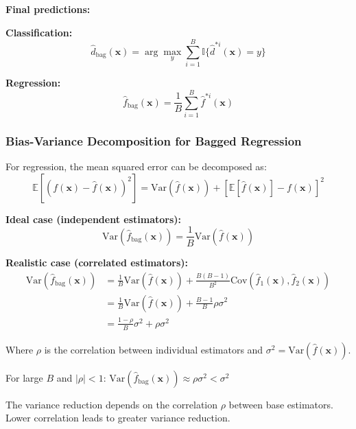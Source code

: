 \documentclass[12pt,a4paper]{article}
\begin{document}
\textbf{Final predictions:}

\textbf{Classification:}
\begin{equation}
\hat{d}_{\text{bag}}(\mathbf{x}) = \arg\max_y \sum_{i=1}^B \mathbb{I}\{\hat{d}^{*i}(\mathbf{x}) = y\}
\end{equation}

\textbf{Regression:}
\begin{equation}
\hat{f}_{\text{bag}}(\mathbf{x}) = \frac{1}{B} \sum_{i=1}^B \hat{f}^{*i}(\mathbf{x})
\end{equation}

\subsubsection{Bias-Variance Decomposition for Bagged Regression}

For regression, the mean squared error can be decomposed as:
\begin{equation}
\mathbb{E}[(f(\mathbf{x}) - \hat{f}(\mathbf{x}))^2] = \text{Var}(\hat{f}(\mathbf{x})) + [\mathbb{E}[\hat{f}(\mathbf{x})] - f(\mathbf{x})]^2
\end{equation}

\textbf{Ideal case (independent estimators):}
\begin{equation}
\text{Var}(\hat{f}_{\text{bag}}(\mathbf{x})) = \frac{1}{B} \text{Var}(\hat{f}(\mathbf{x}))
\end{equation}

\textbf{Realistic case (correlated estimators):}
\begin{align}
\text{Var}(\hat{f}_{\text{bag}}(\mathbf{x})) &= \frac{1}{B} \text{Var}(\hat{f}(\mathbf{x})) + \frac{B(B-1)}{B^2} \text{Cov}(\hat{f}_1(\mathbf{x}), \hat{f}_2(\mathbf{x})) \\
&= \frac{1}{B} \text{Var}(\hat{f}(\mathbf{x})) + \frac{B-1}{B} \rho \sigma^2 \\
&= \frac{1-\rho}{B} \sigma^2 + \rho \sigma^2
\end{align}

Where $\rho$ is the correlation between individual estimators and $\sigma^2 = \text{Var}(\hat{f}(\mathbf{x}))$.

\begin{tcolorbox}[colback=green!5!white,colframe=green!75!black,title=Key Insight]
For large $B$ and $|\rho| < 1$: $\text{Var}(\hat{f}_{\text{bag}}(\mathbf{x})) \approx \rho \sigma^2 < \sigma^2$

The variance reduction depends on the correlation $\rho$ between base estimators. Lower correlation leads to greater variance reduction.
\end{tcolorbox}
\end{document}
